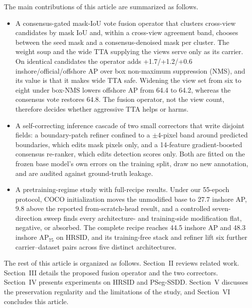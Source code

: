 The main contributions of this article are summarized as follows.
\begin{itemize}
\item A consensus-gated mask-IoU vote fusion operator that clusters cross-view candidates by mask IoU and, within a cross-view agreement band, chooses between the seed mask and a consensus-denoised mask per cluster. The weight soup and the wide TTA supplying the views serve only as its carrier. On identical candidates the operator adds +1.7/+1.2/+0.6 inshore/official/offshore AP over box non-maximum suppression (NMS), and its value is that it makes wide TTA safe. Widening the view set from six to eight under box-NMS lowers offshore AP from 64.4 to 64.2, whereas the consensus vote restores 64.8. The fusion operator, not the view count, therefore decides whether aggressive TTA helps or harms.
\item A self-correcting inference cascade of two small correctors that write disjoint fields: a boundary-patch refiner confined to a $\pm 4$-pixel band around predicted boundaries, which edits mask pixels only, and a 14-feature gradient-boosted consensus re-ranker, which edits detection scores only. Both are fitted on the frozen base model's own errors on the training split, draw no new annotation, and are audited against ground-truth leakage.
\item A pretraining-regime study with full-recipe results. Under our 55-epoch protocol, COCO initialization moves the unmodified base to 27.7 inshore AP, 9.8 above the reported from-scratch-head result, and a controlled seven-direction sweep finds every architecture- and training-side modification flat, negative, or absorbed. The complete recipe reaches 44.5 inshore AP and 48.3 inshore AP$_{75}$ on HRSID, and its training-free stack and refiner lift six further carrier--dataset pairs across five distinct architectures.
\end{itemize}

The rest of this article is organized as follows. Section~II reviews related work. Section~III details the proposed fusion operator and the two correctors. Section~IV presents experiments on HRSID and PSeg-SSDD. Section~V discusses the preservation regularity and the limitations of the study, and Section~VI concludes this article.
